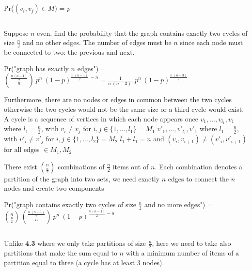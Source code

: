 \documentclass[11pt]{article}
\begin{document}
\subsection{}
Pr($(v_i, v_j) \in M$) = $p$


\subsection{}
Suppose $n$ even, find the probability that the graph contains exactly two cycles of size $\frac{n}{2}$ and no other edges.
The number of edges must be $n$ since each node must be connected to two: the previous and next.

\bigskip
\noindent
Pr("graph has exactly $n$ edges") = $ \displaystyle \binom{\frac{n \ (n-1)}{2}}{n} \ p^n \ (1-p)^{\frac{n \ (n-1)}{2} \ -n} =
\frac{1}{n \ (n-3)!} \ p^n \ (1-p)^{\frac{n \ (n-3)}{2}} $

\bigskip
Furthermore, there are no nodes or edges in common between the two cycles otherwise the two cycles would not be the same size or a third cycle would exist.
A cycle is a sequence of vertices in which each node appears once \newline
$v_1, ..., v_{l_1}, v_1$ where $l_1 = \frac{n}{2}$, with $v_i \neq v_j$ for $i,j \in \{ 1, ..., l_1 \} = M_1$ \newline
$v'_1, ..., v'_{l_1}, v'_1$ where $l_1 = \frac{n}{2}$, with $v'_i \neq v'_j$ for $i,j \in \{ 1, ..., l_2 \} = M_2$ \newline
$l_1 + l_1 = n$ and $(v_i, v_{i+1}) \neq (v'_i, v'_{i+1})$ for all edges $\in M_1, M_2$

\bigskip
There exist $ \displaystyle \binom{n}{\frac{n}{2}} $ combinations of $\frac{n}{2}$ items out of $n$.
Each combination denotes a partition of the graph into two sets, we need exactly $n$ edges to connect the $n$ nodes and create two components

\bigskip
\noindent
Pr("graph contains exactly two cycles of size $\frac{n}{2}$ and no more edges") =
$ \displaystyle \binom{n}{\frac{n}{2}} \ \binom{\frac{n \ (n-1)}{2}}{n} \ p^n \ (1-p)^{\frac{n \ (n-1)}{2} - n} $


\subsection{}
Unlike \textbf{4.3} where we only take partitions of size $\frac{n}{2}$, here we need to take also partitions that make the sum equal to $n$ with a minimum
number of items of a partition equal to three (a cycle has at least 3 nodes).
\end{document}
